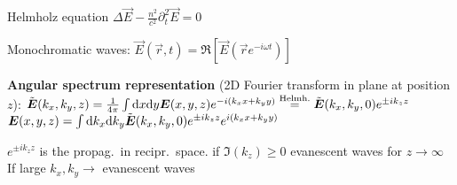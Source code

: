 \begin{squishlist}
    \item Helmholz equation $\Delta \vec{E} - \frac{n^2}{c^2} \partial_t^2 \vec{E} = 0$
    \item Monochromatic waves: $\vec{E}({\vec{r}, t}) = \Re[\vec{E}(\vec{r}e^{-i \omega t})]$
    \item \textbf{Angular spectrum representation} (2D Fourier transform in plane at position $z$): $\tilde{\bm{E}}(k_x, k_y, z) = \frac{1}{4\pi} \int \textrm{d} x \textrm{d} y \bm{E}(x,y,z) e^{-i(k_xx+k_yy)} \overset{\text{Helmh.}}{=} \tilde{\bm{E}}(k_x, k_y, 0) e^{\pm i k_z z}$ \\
    $\bm{E}(x,y,z) = \int \textrm{d} k_x \textrm{d} k_y \tilde{\bm{E}}(k_x,k_y,0)e^{\pm ik_z z} e^{i(k_x x + k_y y)}$
    \item $e^{\pm i k_z z}$ is the propag.\ in recipr.\ space. \squishsep if $\Im(k_z) \geq 0$ evanescent waves for $z \rightarrow \infty$ \\
    If large $k_x,k_y \rightarrow$ evanescent waves
\end{squishlist}
